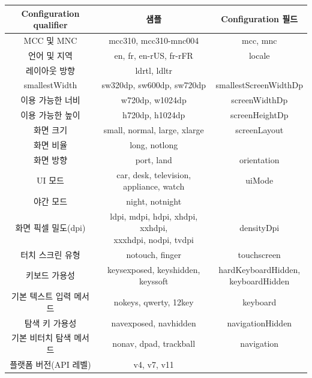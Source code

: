 \begin{longtable}{|c|c|c|}\hline
Configuration qualifier & 샘플 & Configuration 필드 \\ \hline
MCC 및 MNC	& mcc310, mcc310-mnc004  & mcc, mnc \\ \hline
언어 및 지역 & en, fr, en-rUS, fr-rFR & locale \\ \cline{1-2}
레이아웃 방향	& ldrtl, ldltr & \\ \hline
smallestWidth & sw320dp, sw600dp, sw720dp & smallestScreenWidthDp \\ \hline
이용 가능한 너비 & w720dp, w1024dp & screenWidthDp \\ \hline
이용 가능한 높이 & h720dp, h1024dp & screenHeightDp \\ \hline
화면 크기 & small, normal, large, xlarge & screenLayout \\  \cline{1-2}
화면 비율 & long, notlong & \\ \hline
화면 방향 & port, land & orientation \\ \hline
UI 모드	& car, desk, television, appliance, watch & uiMode\\ \cline{1-2}
야간 모드	 & night, notnight &  \\ \hline
화면 픽셀 밀도(dpi) &	\makecell{ldpi, mdpi, hdpi, xhdpi, xxhdpi, \\ xxxhdpi, nodpi, tvdpi} & densityDpi\\ \hline
터치 스크린 유형 &	notouch, finger	& touchscreen \\ \hline
키보드 가용성 & keysexposed, keyshidden, keyssoft	& \makecell{hardKeyboardHidden, \\ keyboardHidden} \\ \hline
기본 텍스트 입력 메서드	& nokeys, qwerty, 12key & keyboard \\ \hline
탐색 키 가용성 & navexposed, navhidden	 & navigationHidden \\ \hline
기본 비터치 탐색 메서드 & nonav, dpad, trackball & navigation \\ \hline
플랫폼 버전(API 레벨) & v4, v7, v11 & \\ \hline
\end{longtable}

